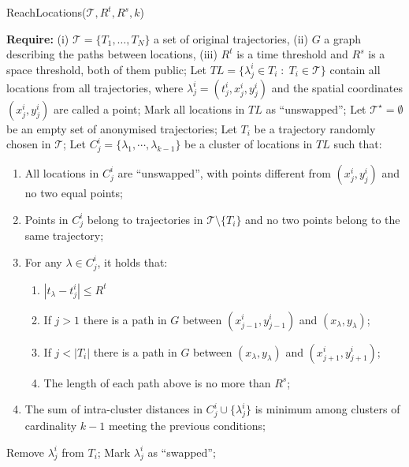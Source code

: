 \begin{algorithm}[p]
\caption{ReachLocations($\mathcal{T},R^t,R^s,k$)} \label{alg:reach}
\begin{algorithmic}[1]
\fontsize{11}{10}\selectfont
\STATE \textbf{Require:}
(i) $\mathcal{T} = \{ T_1, \ldots, T_N \}$ a set of original trajectories,
(ii) $G$ a graph describing the paths between locations,
(iii) $R^t$ is a time threshold and $R^s$ is a space threshold, both
of them public;
\STATE Let $TL = \{\lambda^i_j \in T_i \;:\; T_i \in
\mathcal{T} \}$ contain all locations from all trajectories, where
$\lambda^i_j=(t^i_j,x^i_j, y^i_j)$ and the spatial coordinates
$(x^i_j,y^i_j)$ are called a point;
\STATE Mark all locations in $TL$ as ``unswapped'';
\STATE Let $\mathcal{T^{\star}} = \emptyset$ be an empty set of anonymised trajectories;
    \STATE Let $T_i$ be a trajectory randomly chosen in $\mathcal{T}$;
        \STATE Let $C^i_j = \{\lambda_1, \cdots, \lambda_{k-1}\}$ be
	a cluster of locations in $TL$ such that: \label{line:bestCluster}
\begin{enumerate}
\item All locations in $C^i_j$ are ``unswapped'', with points
different from $(x^i_j,y^i_j)$ and no two equal points;
\item Points in $C^i_j$ belong to trajectories
in $\mathcal{T} \setminus \{T_i\}$
and no two points belong to the same trajectory;
\item For any $\lambda \in C^i_j$, it holds that:
\begin{enumerate}
\item $|t_\lambda - t^i_j| \leq R^t$
\item If $j > 1$ there is a path in $G$ between  $(x^i_{j-1},y^i_{j-1})$
and  $(x_\lambda, y_\lambda)$;
\item If $j < |T_i|$ there is a path in $G$
between $(x_\lambda,y_\lambda)$ and $(x^i_{j+1},y^i_{j+1})$;
\item The length of each path above is no more than $R^s$;
\end{enumerate}
\item The sum of intra-cluster distances
in $C^i_j \cup \{\lambda^i_j\}$ is minimum among clusters
of cardinality $k-1$ meeting the previous conditions;
\end{enumerate}
            \STATE Remove $\lambda^i_j$ from $T_i$;
        \ELSE
	    \STATE Mark $\lambda^i_j$ as ``swapped'';

\end{algorithmic}
\end{algorithm}
